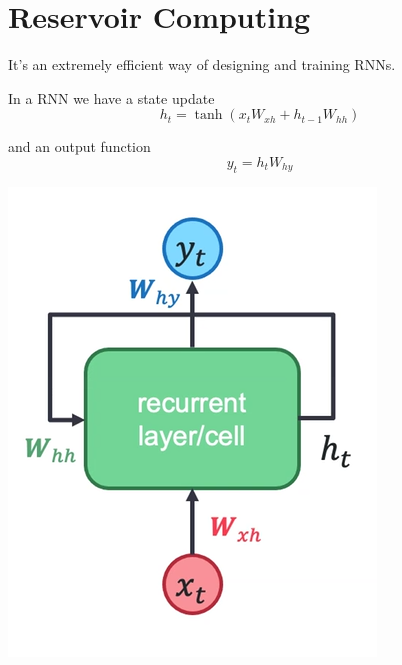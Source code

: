 \documentclass[10pt]{report}
\begin{document}
\section{Reservoir Computing}
It's an extremely efficient way of designing and training RNNs.
\begin{multicols}{2}
In a RNN we have a state update $$h_t=\tanh(x_t W_{xh} + h_{t-1}W_{hh})$$

and an output function $$y_t = h_tW_{hy}$$
\begin{center}
	\includegraphics[scale=0.25]{101.png}
\end{center}
\end{multicols}
\end{document}
